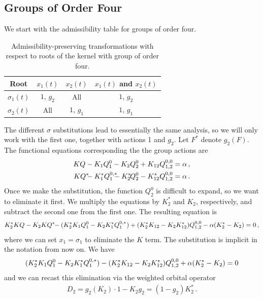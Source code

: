 \subsection{Groups of Order Four}
We start with the admissibility table for groups of order four.
\begin{table}[H]
	\caption{Admissibility-preserving transformations with respect to roots of the kernel with group of order four. }
	\label{tbl:Admissibility4}
	\centering
	\begin{tabular}{cccc}
		\toprule
		Root & $x_1(t)$  & $x_2(t)$ & $x_1(t)$ and $x_2(t)$ \\
		\midrule
		$\sigma_1(t)$	&  $1$, $ g_2$  & All & $1$, $ g_2$\\
		$\sigma_2(t)$ & All & $1$, $ g_1$  & $1$, $ g_1$\\
		\bottomrule
	\end{tabular}
\end{table}
The different $\sigma$ substitutions lead to essentially the same analysis, so we will only work with the first one, together with actions 1 and $g_2$. Let $F^\ast$ denote $g_2(F)$. The functional equations corresponding the the group actions are
\begin{align}
	KQ - K_1 Q_1^0 - K_2 Q_2^0 + K_{12}\Qf{0,0} &= \alpha\,,\\
	KQ^\ast \exxx - K_1^\ast Q_1^{0,\ast}\exxxx- K_2^\ast \!Q_2^0 - K_{12}^\ast \Qf{0,0} &= \alpha\,.
\end{align}
Once we make the substitution, the function $Q_2^0$ is difficult to expand, so we want to eliminate it first. We multiply the equations by $K_2^\ast$ and $K_2$, respectively, and subtract the second one from the first one. The resulting equation is
\begin{align}
\label{eq:SubEq1}
	K_2^\ast KQ - K_2 K Q^\ast \!\!- (K_2^\ast K_1 Q_1^0 - K_2 K_1^\ast Q_1^{0,\ast}) + (K_2^\ast K_{12}-K_2 K_{12}^\ast)Q_{1,2}^{0,0} - \alpha(K_2^\ast - K_2) = 0\,,
\end{align}
where we can set $x_1 = \sigma_1$ to eliminate the $K$ term. The substitution is implicit in the notation from now on. We have
\begin{align}
	(K_2^\ast K_1 Q_1^0 - K_2 K_1^\ast Q_1^{0,\ast}) - (K_2^\ast K_{12}-K_2 K_{12}^\ast)Q_{1,2}^{0,0} + \alpha(K_2^\ast - K_2) = 0
\end{align}
and we can recast this elimination via the weighted orbital operator
\begin{align}
	D_2 = g_2(K_2)\cdot 1 - K_2 g_2 = (1-g_2)K_2^\ast\,.
\end{align}
